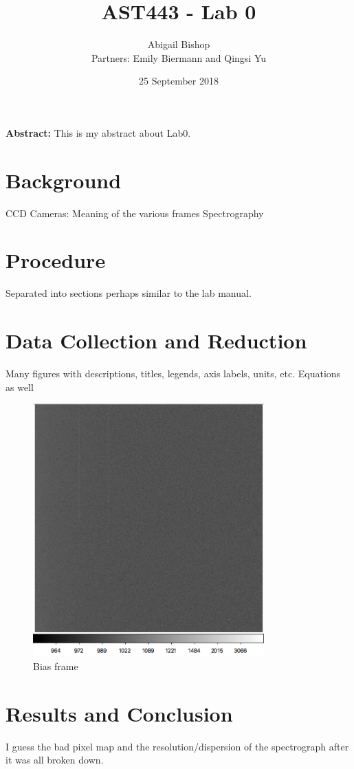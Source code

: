 \documentclass[11pt, oneside]{article}   	%
\title{AST443 - Lab 0}
\author{Abigail Bishop\\Partners: Emily Biermann and Qingsi Yu}
\date{25 September 2018}							%
\begin{document}
\maketitle

\vspace{50pt}

\textbf{Abstract:} This is my abstract about Lab0. 


\newpage

\section{Background}
CCD Cameras: Meaning of the various frames
Spectrography

\section{Procedure}
Separated into sections perhaps similar to the lab manual.

\section{Data Collection and Reduction}
Many figures with descriptions, titles, legends, axis labels, units, etc.
Equations as well

  \begin{figure}
    \centering
    \includegraphics[width=3.5in]{../images/3p1_m10_00000000_BIAS.png}
    \caption{Bias frame}
    \label{fig:m10BIAS}
  \end{figure}

\section{Results and Conclusion}
I guess the bad pixel map and the resolution/dispersion of the spectrograph after it was all broken down.
\end{document}
